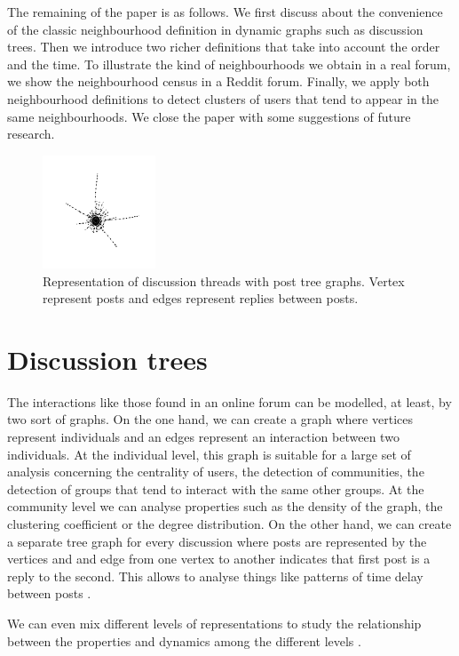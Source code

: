 \documentclass[conference]{IEEEtran}
\begin{document}
The remaining of the paper is as follows. We first discuss about the convenience of the classic neighbourhood definition in dynamic graphs such as discussion trees. Then we introduce two richer definitions that take into account the order and the time. To illustrate the kind of neighbourhoods we obtain in a real forum, we show the neighbourhood census in a Reddit forum. Finally, we apply both neighbourhood definitions to detect clusters of users that tend to appear in the same neighbourhoods.
We close the paper with some suggestions of future research.
\begin{figure}
	\centering
	\includegraphics[width=0.3\textwidth]{tree2}
	\caption{Representation of discussion threads with post tree graphs. Vertex represent posts and edges represent replies between posts.}
	\label{fig:trees}
\end{figure}

\section{Discussion trees}
The interactions like those found in an online forum can be modelled, at least, by two sort of graphs. On the one hand, we can create a graph where vertices represent individuals and an edges represent an interaction between two individuals. At the individual level, this graph is suitable for a large set of analysis concerning the centrality of users, the detection of communities, the detection of groups that tend to interact with the same other groups. At the community level we can analyse properties such as the density of the graph, the clustering coefficient or the degree distribution. On the other hand, we can create a separate tree graph for every discussion where posts are represented by the vertices and and edge from one vertex to another indicates that first post is a reply to the second. This allows to analyse things like patterns of time delay between posts \cite{Bhatt2012}.

We can even mix different levels of representations to study the relationship between the properties and dynamics among the different levels \cite{Dorat2007}.
\end{document}
